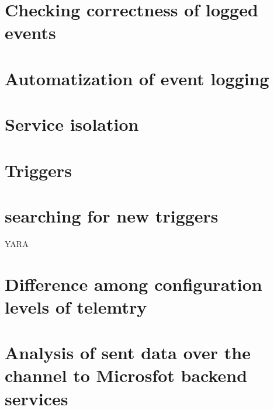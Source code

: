  




\newpage

\section{Checking correctness of logged events}
\section{Automatization of event logging}
\section{Service isolation}
\section{Triggers}
\section{searching for new triggers} YARA
\section{Difference among configuration levels of telemtry}
\section{Analysis of sent data over the channel to Microsfot backend services}
